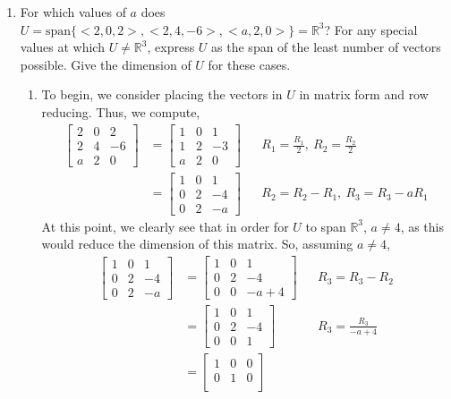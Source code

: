 \documentclass[letterpaper,10pt]{article}
\newcommand{\R}{\mathbb{R}}
\begin{document}
\begin{enumerate}
\item For which values of $a$ does $U=\text{span}\{<2,0,2>,<2,4,-6>,<a,2,0>\}=\R^3$? For any special values at which $U\neq \R^3$, express $U$ as the span of the least number of vectors possible. Give the dimension of $U$ for these cases.
\begin{enumerate}
\item To begin, we consider placing the vectors in $U$ in matrix form and row reducing. Thus, we compute,
\begin{align*}
\begin{bmatrix}
2 & 0 & 2\\
2 & 4 & -6\\
a & 2 & 0
\end{bmatrix} &= \begin{bmatrix}
1 & 0 & 1\\
1 & 2 & -3\\
a & 2 & 0
\end{bmatrix} && R_1=\frac{R_1}{2},\ R_2=\frac{R_2}{2}\\
&=\begin{bmatrix}
1 & 0 & 1\\
0 & 2 & -4\\
0 & 2 & -a
\end{bmatrix} && R_2=R_2-R_1,\ R_3=R_3-aR_1
\end{align*}
At this point, we clearly see that in order for $U$ to span $\R^3$, $a\neq 4$, as this would reduce the dimension of this matrix. So, assuming $a\neq 4$,
\begin{align*}
\begin{bmatrix}
1 & 0 & 1\\
0 & 2 & -4\\
0 & 2 & -a
\end{bmatrix} &= \begin{bmatrix}
1 & 0 & 1\\
0 & 2 & -4\\
0 & 0 & -a+4
\end{bmatrix} && R_3=R_3-R_2\\
&=\begin{bmatrix}
1 & 0 & 1\\
0 & 2 & -4\\
0 & 0 & 1
\end{bmatrix} && R_3=\frac{R_3}{-a+4}\\
&= \begin{bmatrix}
1 & 0 & 0\\
0 & 1 & 0\\

\end{bmatrix}
\end{align*}
\end{enumerate}
\end{enumerate}
\end{document}
